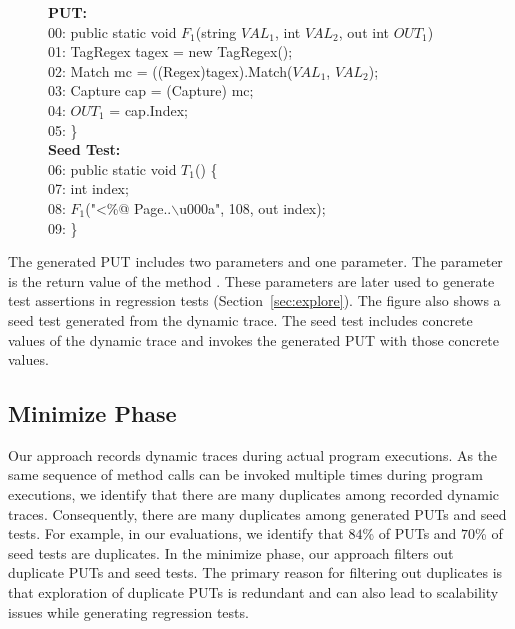 \begin{figure}[t]
\begin{CodeOut}
\textbf{PUT:}\\
00: public static void $F_1$(string $VAL_1$, int $VAL_2$, out int $OUT_1$)\\
01: \hspace*{0.2in}TagRegex tagex = new TagRegex();\\
02: \hspace*{0.2in}Match mc = ((Regex)tagex).Match($VAL_1$, $VAL_2$);\\
03: \hspace*{0.2in}Capture cap = (Capture) mc;\\
04: \hspace*{0.2in}$OUT_1$ = cap.Index;\\
05: \}\\

\textbf{Seed Test:}\\
06: public static void $T_1$() \{\\
07: \hspace*{0.2in}int index;\\
08: \hspace*{0.2in}$F_1$("<\%@ Page..$\backslash$u000a", 108, out index);\\
09: \}\\
\end{CodeOut}\vspace*{-3ex}
\vspace*{-3ex}
\end{figure}

The generated PUT includes two parameters and one  parameter. The  parameter is the return value of the method . These  parameters are later used to generate test assertions in regression tests (Section~\ref{sec:explore}). The figure also shows a seed test generated from the dynamic trace. 
The seed test includes concrete values of the dynamic trace and invokes the generated PUT with those concrete values.

\subsection{Minimize Phase}
\label{sec:minimize}

Our approach records dynamic traces during actual program executions. As the same sequence of method calls can be invoked multiple times during program executions,
we identify that there are many duplicates among recorded dynamic traces. Consequently, there are many duplicates among generated PUTs and seed tests. For example, in our evaluations, we identify that $84$\% of PUTs and $70$\% of seed tests are duplicates. In the minimize phase, our approach filters out duplicate PUTs and seed tests.
The primary reason for filtering out duplicates is that exploration of duplicate PUTs is redundant and can also lead to scalability issues while generating regression tests.

